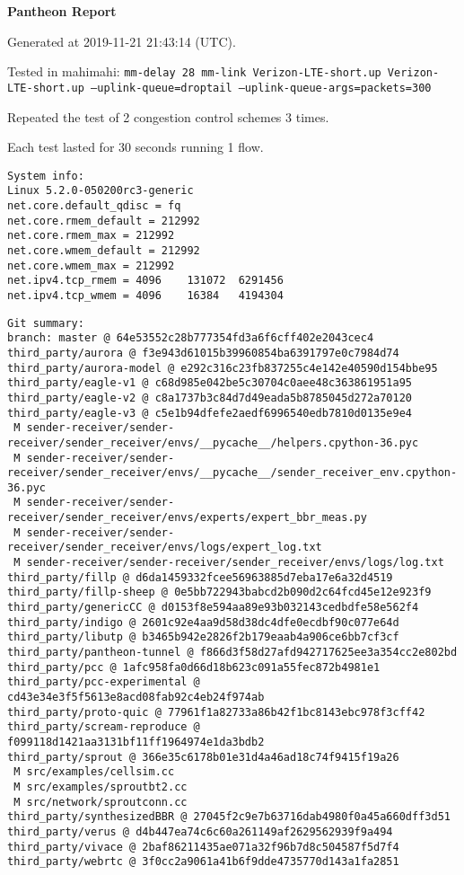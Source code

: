 \documentclass{article}
\begin{document}
\centerline{\textbf{\large{Pantheon Report}}}
\vspace{20pt}

Generated at 2019-11-21 21:43:14 (UTC).

Tested in mahimahi: \texttt{mm-delay 28 mm-link Verizon-LTE-short.up Verizon-LTE-short.up --uplink-queue=droptail --uplink-queue-args=packets=300}

Repeated the test of 2 congestion control schemes 3 times.

Each test lasted for 30 seconds running 1 flow.

\begin{verbatim}
System info:
Linux 5.2.0-050200rc3-generic
net.core.default_qdisc = fq
net.core.rmem_default = 212992
net.core.rmem_max = 212992
net.core.wmem_default = 212992
net.core.wmem_max = 212992
net.ipv4.tcp_rmem = 4096	131072	6291456
net.ipv4.tcp_wmem = 4096	16384	4194304
\end{verbatim}

\begin{verbatim}
Git summary:
branch: master @ 64e53552c28b777354fd3a6f6cff402e2043cec4
third_party/aurora @ f3e943d61015b39960854ba6391797e0c7984d74
third_party/aurora-model @ e292c316c23fb837255c4e142e40590d154bbe95
third_party/eagle-v1 @ c68d985e042be5c30704c0aee48c363861951a95
third_party/eagle-v2 @ c8a1737b3c84d7d49eada5b8785045d272a70120
third_party/eagle-v3 @ c5e1b94dfefe2aedf6996540edb7810d0135e9e4
 M sender-receiver/sender-receiver/sender_receiver/envs/__pycache__/helpers.cpython-36.pyc
 M sender-receiver/sender-receiver/sender_receiver/envs/__pycache__/sender_receiver_env.cpython-36.pyc
 M sender-receiver/sender-receiver/sender_receiver/envs/experts/expert_bbr_meas.py
 M sender-receiver/sender-receiver/sender_receiver/envs/logs/expert_log.txt
 M sender-receiver/sender-receiver/sender_receiver/envs/logs/log.txt
third_party/fillp @ d6da1459332fcee56963885d7eba17e6a32d4519
third_party/fillp-sheep @ 0e5bb722943babcd2b090d2c64fcd45e12e923f9
third_party/genericCC @ d0153f8e594aa89e93b032143cedbdfe58e562f4
third_party/indigo @ 2601c92e4aa9d58d38dc4dfe0ecdbf90c077e64d
third_party/libutp @ b3465b942e2826f2b179eaab4a906ce6bb7cf3cf
third_party/pantheon-tunnel @ f866d3f58d27afd942717625ee3a354cc2e802bd
third_party/pcc @ 1afc958fa0d66d18b623c091a55fec872b4981e1
third_party/pcc-experimental @ cd43e34e3f5f5613e8acd08fab92c4eb24f974ab
third_party/proto-quic @ 77961f1a82733a86b42f1bc8143ebc978f3cff42
third_party/scream-reproduce @ f099118d1421aa3131bf11ff1964974e1da3bdb2
third_party/sprout @ 366e35c6178b01e31d4a46ad18c74f9415f19a26
 M src/examples/cellsim.cc
 M src/examples/sproutbt2.cc
 M src/network/sproutconn.cc
third_party/synthesizedBBR @ 27045f2c9e7b63716dab4980f0a45a660dff3d51
third_party/verus @ d4b447ea74c6c60a261149af2629562939f9a494
third_party/vivace @ 2baf86211435ae071a32f96b7d8c504587f5d7f4
third_party/webrtc @ 3f0cc2a9061a41b6f9dde4735770d143a1fa2851
\end{verbatim}
\end{document}
